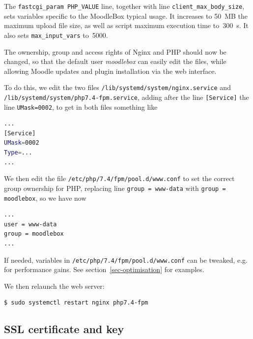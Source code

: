 \documentclass[12pt]{article}
\begin{document}
The \lstinline{fastcgi_param PHP_VALUE} line, together with line \lstinline{client_max_body_size}, sets variables specific to the MoodleBox typical usage.
It increases to 50~MB the maximum upload file size, as well as script maximum execution time to~300~s.
It also sets \lstinline{max_input_vars} to~5000.

The ownership, group and access rights of Nginx and PHP should now be changed, so that the default user \emph{moodlebox} can easily edit the files, while allowing Moodle updates and plugin installation via the web interface.

To do this, we edit the two files \lstinline{/lib/systemd/system/nginx.service} and \lstinline{/lib/systemd/system/php7.4-fpm.service}, adding after the line \lstinline{[Service]} the line \lstinline{UMask=0002}, to get in both files something like
\begin{lstlisting}[language=bash]
...
[Service]
UMask=0002
Type=...
...
\end{lstlisting}
We then edit the file \lstinline{/etc/php/7.4/fpm/pool.d/www.conf} to set the correct group ownership for PHP, replacing line \lstinline{group = www-data} with \lstinline{group = moodlebox}, so we have now
\begin{lstlisting}[language=bash]
...
user = www-data
group = moodlebox
...
\end{lstlisting}
If needed, variables in \lstinline{/etc/php/7.4/fpm/pool.d/www.conf} can be tweaked, e.g. for performance gains. See section~\ref{sec-optimisation} for examples.

We then relaunch the web server:
\begin{lstlisting}[language=bash]
$ sudo systemctl restart nginx php7.4-fpm
\end{lstlisting}

\subsection{SSL certificate and key}
\end{document}
